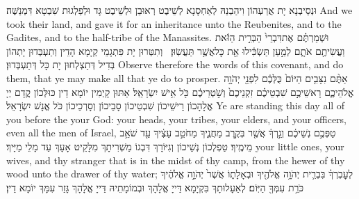 {וּנְסֵיבְנָא יָת אֲרַעְהוֹן וִיהַבְנַהּ לְאַחְסָנָא לְשֵׁיבֶט רְאוּבֵן וּלְשֵׁיבֶט גָּד וּלְפַלְגוּת שִׁבְטָא דִּמְנַשֶּׁה׃}
{And we took their land, and gave it for an inheritance unto the Reubenites, and to the Gadites, and to the half-tribe of the Manassites.}{}
{וּשְׁמַרְתֶּ֗ם אֶת\maqqaf דִּבְרֵי֙ הַבְּרִ֣ית הַזֹּ֔את וַעֲשִׂיתֶ֖ם אֹתָ֑ם לְמַ֣עַן תַּשְׂכִּ֔ילוּ אֵ֖ת כׇּל\maqqaf אֲשֶׁ֥ר תַּעֲשֽׂוּן׃ \petucha }
{וְתִטְּרוּן יָת פִּתְגָמֵי קְיָמָא הָדֵין וְתַעְבְּדוּן יָתְהוֹן בְּדִיל דְּתַצְלְחוּן יָת כָּל דְּתַעְבְּדוּן׃}
{Observe therefore the words of this covenant, and do them, that ye may make all that ye do to prosper.}{}
{אַתֶּ֨ם נִצָּבִ֤ים הַיּוֹם֙ כֻּלְּכֶ֔ם לִפְנֵ֖י יְהֹוָ֣ה אֱלֹהֵיכֶ֑ם רָאשֵׁיכֶ֣ם שִׁבְטֵיכֶ֗ם זִקְנֵיכֶם֙ וְשֹׁ֣טְרֵיכֶ֔ם כֹּ֖ל אִ֥ישׁ יִשְׂרָאֵֽל׃}
{אַתּוּן קָיְמִין יוֹמָא דֵין כּוּלְּכוֹן קֳדָם יְיָ אֱלָהָכוֹן רֵישֵׁיכוֹן שִׁבְטֵיכוֹן סָבֵיכוֹן וְסָרְכֵיכוֹן כֹּל אֱנָשׁ יִשְׂרָאֵל׃}
{Ye are standing this day all of you before the \lord\space your God: your heads, your tribes, your elders, and your officers, even all the men of Israel,}{}
{טַפְּכֶ֣ם נְשֵׁיכֶ֔ם וְגֵ֣רְךָ֔ אֲשֶׁ֖ר בְּקֶ֣רֶב מַחֲנֶ֑יךָ מֵחֹטֵ֣ב עֵצֶ֔יךָ עַ֖ד שֹׁאֵ֥ב מֵימֶֽיךָ׃}
{טַפְלְכוֹן נְשֵׁיכוֹן וְגִיּוֹרָךְ דִּבְגוֹ מַשְׁרִיתָךְ מִלָּקֵיט אָעָךְ עַד מָלֵי מַיָּיךְ׃}
{your little ones, your wives, and thy stranger that is in the midst of thy camp, from the hewer of thy wood unto the drawer of thy water;}{}
{לְעׇבְרְךָ֗ בִּבְרִ֛ית יְהֹוָ֥ה אֱלֹהֶ֖יךָ וּבְאָלָת֑וֹ אֲשֶׁר֙ יְהֹוָ֣ה אֱלֹהֶ֔יךָ כֹּרֵ֥ת עִמְּךָ֖ הַיּֽוֹם׃}
{לְאַעָלוּתָךְ בִּקְיָמָא דַּייָ אֱלָהָךְ וּבְמוֹמָתֵיהּ דַּייָ אֱלָהָךְ גָּזַר עִמָּךְ יוֹמָא דֵין׃}

